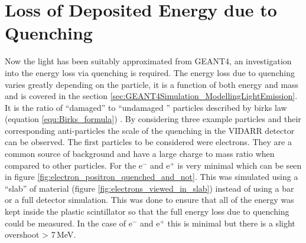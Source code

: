 \section{Loss of Deposited Energy due to Quenching}\label{sec:GEANT4Simulation_quenchingLoss}
Now the light has been suitably approximated from GEANT4, an investigation into the energy loss via quenching is required. The energy loss due to quenching varies greatly depending on the particle, it is a function of both energy and mass and is covered in the section \ref{sec:GEANT4Simulation_ModellingLightEmission}. It is the ratio of ``damaged'' to ``undamaged '' particles \cite{craun_1970} described by birks law (equation \ref{equ:Birks_formula}) \cite{knoll_2010}. By considering three example particles and their corresponding anti-particles the scale of the quenching in the VIDARR detector can be observed. The first particles to be considered were electrons. They are a common source of background and have a large charge to mass ratio when compared to other particles. For the e$^-$ and e$^+$ is very minimal which can be seen in figure \ref{fig:electron_positron_quenched_and_not}. This was simulated using a ``slab'' of material (figure \ref{fig:electrons_viewed_in_slab}) instead of using a bar or a full detector simulation. This was done to ensure that all of the energy was kept inside the plastic scintillator so that the full energy loss due to quenching could be measured. In the case of e$^-$ and e$^+$ this is minimal but there is a slight overshoot > 7\,MeV. 

